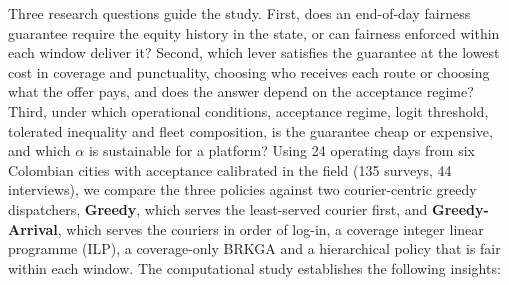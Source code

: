 \documentclass[a4paper,11pt,review,3p,authoryear]{elsarticle}
\begin{document}
Three research questions guide the study. First, does an end-of-day fairness guarantee require the equity history in the state, or can fairness enforced within each window deliver it? Second, which lever satisfies the guarantee at the lowest cost in coverage and punctuality, choosing who receives each route or choosing what the offer pays, and does the answer depend on the acceptance regime? Third, under which operational conditions, acceptance regime, logit threshold, tolerated inequality and fleet composition, is the guarantee cheap or expensive, and which $\alpha$ is sustainable for a platform? Using 24 operating days from six Colombian cities with acceptance calibrated in the field (135 surveys, 44 interviews), we compare the three policies against two courier-centric greedy dispatchers, \textbf{Greedy}, which serves the least-served courier first, and \textbf{Greedy-Arrival}, which serves the couriers in order of log-in, a coverage integer linear programme (ILP), a coverage-only BRKGA and a hierarchical policy that is fair within each window. The computational study establishes the following insights:
\end{document}
